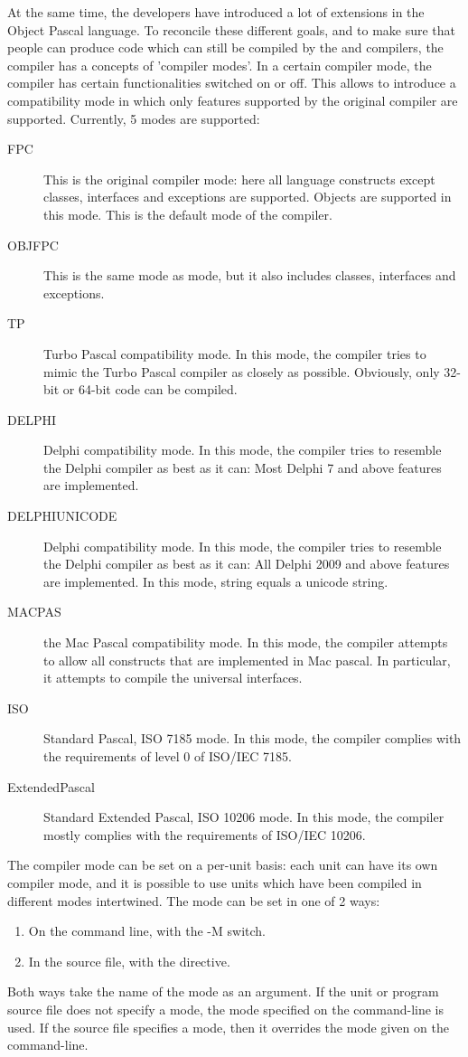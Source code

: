 At the same time, the \fpc developers have introduced a lot of extensions
in the Object Pascal language. To reconcile these different goals, and to
make sure that people can produce code which can still be compiled by
the \tp and \delphi compilers, the compiler has a concepts of 'compiler
modes'. In a certain compiler mode, the compiler has certain functionalities
switched on or off. This allows to introduce a compatibility mode in which
only features supported by the original compiler are supported. Currently,
5 modes are supported:
\begin{description}
\item[FPC] This is the original \fpc compiler mode: here all language
constructs except classes, interfaces and exceptions are supported.
Objects are supported in this mode. This is the default mode of the
compiler.
\item[OBJFPC] This is the same mode as  mode, but it also includes
classes, interfaces and exceptions.
\item[TP] Turbo Pascal compatibility mode. In this mode, the compiler tries
to mimic the Turbo Pascal compiler as closely as possible. Obviously, only
32-bit or 64-bit code can be compiled.
\item[DELPHI] Delphi compatibility mode. In this mode, the compiler tries
to resemble the Delphi compiler as best as it can: Most Delphi 7 and above
features are implemented.
\item[DELPHIUNICODE] Delphi compatibility mode. In this mode, the compiler tries
to resemble the Delphi compiler as best as it can: All Delphi 2009 and above features are
implemented.  In this mode, string equals a unicode string.
\item[MACPAS] the Mac Pascal compatibility mode. In this mode, the compiler
attempts to allow all constructs that are implemented in Mac pascal. In
particular, it attempts to compile the universal interfaces.
\item[ISO] Standard Pascal, ISO 7185 mode. In this mode, the compiler complies
with the requirements of level 0 of ISO/IEC 7185.
\item[ExtendedPascal] Standard Extended Pascal, ISO 10206 mode. In this mode, the compiler mostly complies
with the requirements of ISO/IEC 10206.
\end{description}

The compiler mode can be set on a per-unit basis: each unit can have its
own compiler mode, and it is possible to use units which have been compiled
in different modes intertwined. The mode can be set in one of 2 ways:
\begin{enumerate}
\item On the command line, with the -M switch.
\item In the source file, with the  directive.
\end{enumerate}
Both ways take the name of the mode as an argument. If the unit or program
source file does not specify a mode, the mode specified on the command-line
is used. If the source file specifies a mode, then it overrides the mode
given on the command-line.

